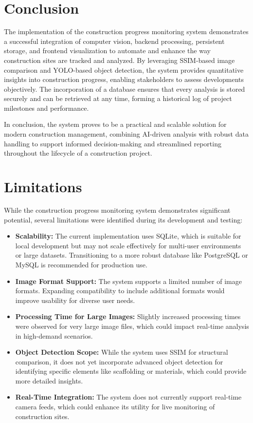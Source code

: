 \section{Conclusion}
The implementation of the construction progress monitoring system demonstrates a successful integration of computer vision, backend processing, persistent storage, and frontend visualization to automate and enhance the way construction sites are tracked and analyzed. By leveraging SSIM-based image comparison and YOLO-based object detection, the system provides quantitative insights into construction progress, enabling stakeholders to assess developments objectively. The incorporation of a database ensures that every analysis is stored securely and can be retrieved at any time, forming a historical log of project milestones and performance.

In conclusion, the system proves to be a practical and scalable solution for modern construction management, combining AI-driven analysis with robust data handling to support informed decision-making and streamlined reporting throughout the lifecycle of a construction project.

\section{Limitations}
While the construction progress monitoring system demonstrates significant potential, several limitations were identified during its development and testing:
\begin{itemize}
    \item \textbf{Scalability:} The current implementation uses SQLite, which is suitable for local development but may not scale effectively for multi-user environments or large datasets. Transitioning to a more robust database like PostgreSQL or MySQL is recommended for production use.
    \item \textbf{Image Format Support:} The system supports a limited number of image formats. Expanding compatibility to include additional formats would improve usability for diverse user needs.
    \item \textbf{Processing Time for Large Images:} Slightly increased processing times were observed for very large image files, which could impact real-time analysis in high-demand scenarios.
    \item \textbf{Object Detection Scope:} While the system uses SSIM for structural comparison, it does not yet incorporate advanced object detection for identifying specific elements like scaffolding or materials, which could provide more detailed insights.
    \item \textbf{Real-Time Integration:} The system does not currently support real-time camera feeds, which could enhance its utility for live monitoring of construction sites.
\end{itemize}

